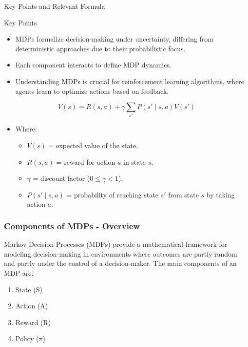 \documentclass[aspectratio=169]{beamer}
\begin{document}
\begin{frame}[fragile]{Key Points and Relevant Formula}
    \begin{block}{Key Points}
        \begin{itemize}
            \item MDPs formalize decision-making under uncertainty, differing from deterministic approaches due to their probabilistic focus.
            \item Each component interacts to define MDP dynamics.
            \item Understanding MDPs is crucial for reinforcement learning algorithms, where agents learn to optimize actions based on feedback.
        \end{itemize}
    \end{block}

    \begin{equation}
        V(s) = R(s, a) + \gamma \sum_{s'} P(s' \mid s, a) V(s')
    \end{equation}
    \begin{itemize}
        \item Where:
        \begin{itemize}
            \item $V(s)$ = expected value of the state,
            \item $R(s, a)$ = reward for action $a$ in state $s$,
            \item $\gamma$ = discount factor ($0 \leq \gamma < 1$),
            \item $P(s' \mid s, a)$ = probability of reaching state $s'$ from state $s$ by taking action $a$.
        \end{itemize}
    \end{itemize}
\end{frame}

\begin{frame}[fragile]
    \frametitle{Components of MDPs - Overview}
    Markov Decision Processes (MDPs) provide a mathematical framework for modeling decision-making in environments where outcomes are partly random and partly under the control of a decision-maker. The main components of an MDP are:
    \begin{enumerate}
        \item State (S)
        \item Action (A)
        \item Reward (R)
        \item Policy ($\pi$)
    \end{enumerate}
\end{frame}
\end{document}
